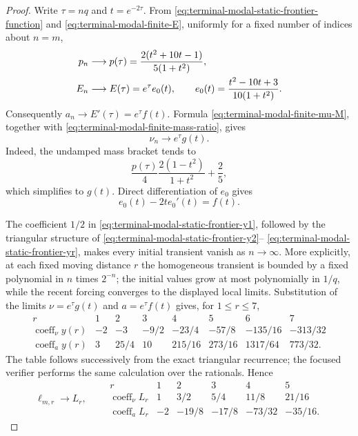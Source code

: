 \begin{proof}
Write $\tau=nq$ and $t=e^{-2\tau}$.  From
\eqref{eq:terminal-modal-static-frontier-function} and
\eqref{eq:terminal-modal-finite-E}, uniformly for a fixed number of indices
about $n=m$,
\begin{align}
 p_n&\longrightarrow
 p(\tau)=\frac{2(t^2+10t-1)}{5(1+t^2)},\notag\\
 E_n&\longrightarrow E(\tau)=e^\tau e_0(t),
 \qquad
 e_0(t)=\frac{t^2-10t+3}{10(1+t^2)}.
 \label{eq:terminal-modal-static-frontier-input-limits}
\end{align}
Consequently $a_n\to E'(\tau)=e^\tau f(t)$.  Formula
\eqref{eq:terminal-modal-finite-mu-M}, together with
\eqref{eq:terminal-modal-finite-mass-ratio}, gives
\begin{equation}
 \nu_n\longrightarrow e^\tau g(t).
 \label{eq:terminal-modal-static-frontier-nu-limit}
\end{equation}
Indeed, the undamped mass bracket tends to
\[
 \frac{p(\tau)}4\frac{2(1-t^2)}{1+t^2}+\frac25,
\]
which simplifies to $g(t)$.  Direct differentiation of $e_0$ gives
\[
 e_0(t)-2te_0'(t)=f(t).
\]

The coefficient $1/2$ in
\eqref{eq:terminal-modal-static-frontier-y1}, followed by the triangular
structure of \eqref{eq:terminal-modal-static-frontier-y2}--
\eqref{eq:terminal-modal-static-frontier-yr}, makes every initial transient
vanish as $n\to\infty$.  More explicitly, at each fixed moving distance $r$
the homogeneous transient is bounded by a fixed polynomial in $n$ times
$2^{-n}$; the initial values grow at most polynomially in $1/q$, while the
recent forcing converges to the displayed local limits.  Substitution of the limits
$\nu=e^\tau g(t)$ and $a=e^\tau f(t)$ gives, for $1\le r\le7$,
\begin{equation}
\begin{array}{c|rrrrrrr}
 r&1&2&3&4&5&6&7\\ \hline
 \operatorname{coeff}_{\nu}y(r)&-2&-3&-9/2&-23/4&-57/8&-135/16&-313/32\\
 \operatorname{coeff}_{a}y(r)&3&25/4&10&215/16&273/16&1317/64&773/32.
\end{array}
 \label{eq:terminal-modal-static-frontier-y-limit-table}
\end{equation}
The table follows successively from the exact triangular recurrence; the
focused verifier performs the same calculation over the rationals.  Hence
\begin{equation}
 \ell_{m,r}\longrightarrow L_r,\qquad
\begin{array}{c|rrrrr}
 r&1&2&3&4&5\\ \hline
 \operatorname{coeff}_{\nu}L_r&1&3/2&5/4&11/8&21/16\\
 \operatorname{coeff}_{a}L_r&-2&-19/8&-17/8&-73/32&-35/16.
\end{array}
 \label{eq:terminal-modal-static-frontier-L-limit-table}
\end{equation}


\end{proof}
